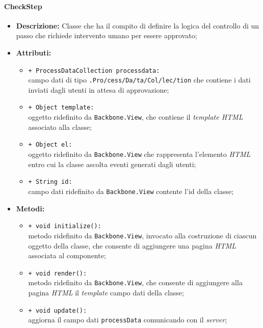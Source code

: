 \paragraph{CheckStep}
\begin{flushleft}
\begin{itemize}
\item \textbf{Descrizione:} Classe che ha il compito di definire la logica del controllo di un passo che richiede intervento umano per essere approvato;
\item \textbf{Attributi:}
\begin{sloppypar}
\begin{itemize}
\item \texttt{+ ProcessDataCollection processdata:}\\ campo dati di tipo \texttt{\collection{}.Pro\fshyp{}cess\fshyp{}Da\fshyp{}ta\fshyp{}Col\fshyp{}lec\fshyp{}tion} che contiene i dati inviati dagli utenti in attesa di approvazione;
\item \texttt{+ Object template:}\\ oggetto ridefinito da \texttt{Backbone.View}, che contiene il \textit{template HTML} associato alla classe;
\item \texttt{+ Object el:}\\ oggetto ridefinito da \texttt{Backbone.View} che rappresenta l'elemento \textit{HTML} entro cui la classe ascolta eventi generati dagli utenti;
\item \texttt{+ String id:}\\ campo dati ridefinito da \texttt{Backbone.View} contente l'id della classe;
\end{itemize}
\end{sloppypar}
\item \textbf{Metodi:}
\begin{sloppypar}
\begin{itemize}
\item \texttt{+ void initialize():}\\ metodo ridefinito da \texttt{Backbone.View}, invocato alla costruzione di ciascun oggetto della classe, che consente di aggiungere una pagina \textit{HTML} associata al componente;
\item \texttt{+ void render():}\\ metodo ridefinito da \texttt{Backbone.View}, che consente di aggiungere alla pagina \textit{HTML} il \textit{template} campo dati della classe;
\item \texttt{+ void update():}\\ aggiorna il campo dati \texttt{processData} comunicando con il \textit{server};

\end{itemize}
\end{sloppypar}
\end{itemize}
\end{flushleft}
